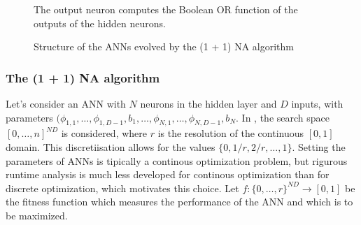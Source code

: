 \begin{figure}
    \begin{center}
        \caption{Structure of the ANNs evolved by the (1 + 1) NA algorithm}{The output neuron computes the Boolean OR function of the outputs of the hidden neurons.}
        \label{fig:oneplusonena_ann}
    \end{center}
\end{figure}

\subsubsection{The (1 + 1) NA algorithm}

Let's consider an ANN with $N$ neurons in the hidden layer and $D$ inputs, with parameters
$(\phi_{1,1}, \dots, \phi_{1,D-1}, b_1, \dots, \phi_{N,1}, \dots, \phi_{N,D-1}, b_N$.
In \cite{na}, the search space $[0 , \dots, n]^{N D}$ is considered, where $r$ is the resolution of the continuous $[0, 1]$ domain.
This discretiisation allows for the values $\{0, 1/r, 2/r, \dots, 1\}$. Setting the parameters of ANNs is tipically a continous optimization problem,
but rigurous runtime analysis is much less developed for continous optimization than for discrete optimization, which motivates this choice.
Let $f : \{0 , \dots, r\}^{N D} \to [0, 1]$ be the fitness function which measures the performance of the ANN and which is to be maximized.

